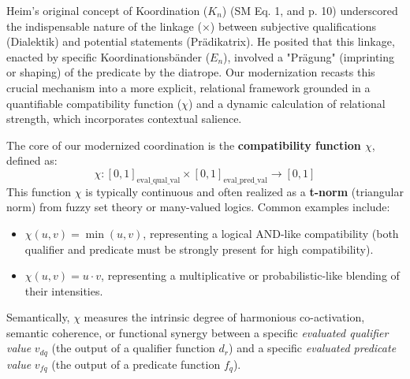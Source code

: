\documentclass[
    12pt,              %
    a4paper,           %
    headings=normal,   %
    twoside=true,      %
    BCOR=8mm,          %
]{scrbook}
\newcommand{\koordination}{K_n}
\begin{document}
Heim's original concept of Koordination (\(\koordination\)) (SM Eq. 1, and p. 10) underscored the indispensable nature of the linkage (\(\times\)) between subjective qualifications (Dialektik) and potential statements (Prädikatrix). He posited that this linkage, enacted by specific Koordinationsbänder (\(E_n\)), involved a "Prägung" (imprinting or shaping) of the predicate by the diatrope. Our modernization recasts this crucial mechanism into a more explicit, relational framework grounded in a quantifiable compatibility function (\(\chi\)) and a dynamic calculation of relational strength, which incorporates contextual salience.

The core of our modernized coordination is the \textbf{compatibility function \(\chi\)}, defined as:
\[ \chi: [0,1]_{\text{eval\_qual\_val}} \times [0,1]_{\text{eval\_pred\_val}} \to [0,1] \]
This function \(\chi\) is typically continuous and often realized as a \textbf{t-norm} (triangular norm) from fuzzy set theory or many-valued logics. Common examples include:
\begin{itemize}
    \item   \(\chi(u,v) = \min(u,v)\), representing a logical AND-like compatibility (both qualifier and predicate must be strongly present for high compatibility).
    \item   \(\chi(u,v) = u \cdot v\), representing a multiplicative or probabilistic-like blending of their intensities.
\end{itemize}
Semantically, \(\chi\) measures the intrinsic degree of harmonious co-activation, semantic coherence, or functional synergy between a specific \textit{evaluated qualifier value} \(v_{dq}\) (the output of a qualifier function \(d_r\)) and a specific \textit{evaluated predicate value} \(v_{fq}\) (the output of a predicate function \(f_q\)).
\end{document}
